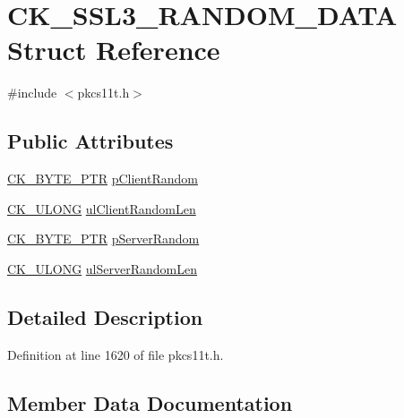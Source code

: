 \hypertarget{struct_c_k___s_s_l3___r_a_n_d_o_m___d_a_t_a}{}\section{C\+K\+\_\+\+S\+S\+L3\+\_\+\+R\+A\+N\+D\+O\+M\+\_\+\+D\+A\+TA Struct Reference}
\label{struct_c_k___s_s_l3___r_a_n_d_o_m___d_a_t_a}


{\ttfamily \#include $<$pkcs11t.\+h$>$}

\subsection*{Public Attributes}
\begin{DoxyCompactItemize}
\item 
\hyperlink{pkcs11t_8h_a3d7233a4077fbaf7ae76b64da0a62a21}{C\+K\+\_\+\+B\+Y\+T\+E\+\_\+\+P\+TR} \hyperlink{struct_c_k___s_s_l3___r_a_n_d_o_m___d_a_t_a_a755ea91cff2ee6fec1e18ca9c3cef73a}{p\+Client\+Random}
\item 
\hyperlink{pkcs11t_8h_a35181858a3b7a0a81f49d180d8f446ef}{C\+K\+\_\+\+U\+L\+O\+NG} \hyperlink{struct_c_k___s_s_l3___r_a_n_d_o_m___d_a_t_a_a7600adeb062aab5564a696a245a52d5a}{ul\+Client\+Random\+Len}
\item 
\hyperlink{pkcs11t_8h_a3d7233a4077fbaf7ae76b64da0a62a21}{C\+K\+\_\+\+B\+Y\+T\+E\+\_\+\+P\+TR} \hyperlink{struct_c_k___s_s_l3___r_a_n_d_o_m___d_a_t_a_ae4a4d7d0c9586d996db0d37269ade3ad}{p\+Server\+Random}
\item 
\hyperlink{pkcs11t_8h_a35181858a3b7a0a81f49d180d8f446ef}{C\+K\+\_\+\+U\+L\+O\+NG} \hyperlink{struct_c_k___s_s_l3___r_a_n_d_o_m___d_a_t_a_a2a275093e7bbe9297b76ed08a7056ceb}{ul\+Server\+Random\+Len}
\end{DoxyCompactItemize}


\subsection{Detailed Description}


Definition at line 1620 of file pkcs11t.\+h.



\subsection{Member Data Documentation}
\mbox{\label{struct_c_k___s_s_l3___r_a_n_d_o_m___d_a_t_a_a755ea91cff2ee6fec1e18ca9c3cef73a}} 
